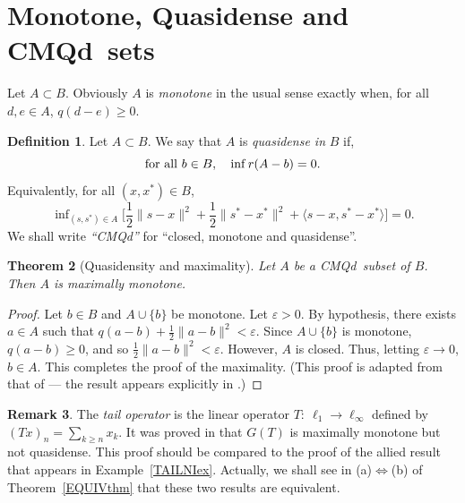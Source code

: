 \documentclass[letterpaper]{article}
\theoremstyle{plain}
\newtheorem{theorem}{Theorem}[section]
\theoremstyle{definition}
\newtheorem{definition}[theorem]{Definition}
\newtheorem{remark}[theorem]{Remark}
\numberwithin{equation}{section}
\newcommand{\all}{\hbox{for all}}
\newcommand{\bra}[2]{\langle#1,#2\rangle}
\newcommand{\cmqd}{{CMQd}}
\newcommand{\eps}{\varepsilon}
\newcommand{\half}{{\textstyle\frac{1}{2}}}
\newcommand{\infn}{\inf\nolimits}
\newcommand{\Def}{Definition~\ref}
\newcommand{\Ex}{Example~\ref}
\newcommand{\Rem}{Remark~\ref}
\newcommand{\Sec}{Section~\ref}
\newcommand{\Thm}{Theorem~\ref}
\begin{document}
\section{Monotone, Quasidense and \cmqd\ sets}\label{QDsec}
Let $A \subset B$.   Obviously $A$ is {\em monotone} in the usual sense exactly when, for all $d,e \in A$, $q(d - e) \ge 0$.
\begin{definition}\label{QDdef}
Let $A \subset B$.   We say that $A$ is {\em quasidense in }$B$ if,
\begin{equation}\label{QD1}
\all\ b \in B,\quad \infn r(A - b) = 0.
\end{equation} 
%
Equivalently, for all $(x,x^*) \in B$, 
\begin{equation}\label{QD2}
\infn_{(s,s^*) \in A}\big[\half\|s - x\|^2 + \half\|s^* - x^*\|^2 + \bra{s - x}{s^* - x^*}\big] = 0.
\end{equation}
%
We shall write {\em ``\cmqd''} for ``closed, monotone and quasidense''. 
\end{definition}
\begin{theorem}[Quasidensity and maximality]\label{RLMAXthm}
Let $A$ be a \cmqd\ subset of $B$.   Then $A$ is maximally monotone. 
\end{theorem}
%
\begin{proof}
Let $b \in B$ and $A \cup \{b\}$ be monotone.   Let $\eps > 0$.   By hypothesis, there exists $a \in A$ such that $q(a - b) + \half\|a - b\|^2 < \eps$.   Since $A \cup \{b\}$ is monotone, $q(a - b) \ge 0$, and so $\half\|a - b\|^2 < \eps$.   However, $A$ is closed.   Thus, letting $\eps \to 0$,  $b \in A$.   This completes the proof of the maximality.   \big(This proof is adapted from that of \cite[Lemma 4.7, p.\ 1027]{PARTONE} --- the result appears explicitly in \cite[Theorem 7.4(a), pp.\ 1032--1033]{PARTONE}.\big)     
\end{proof}
\begin{remark}\label{TAILrem}
The {\em tail operator} is the linear operator $T\colon\ \ell_1 \to \ell_\infty$ defined by $(Tx)_n = \sum_{k \ge n} x_k$.   It was proved in \cite[Example 7.10, p.\ 1034--1035]{PARTONE} that $G(T)$ is maximally monotone but not quasidense.  This proof should be compared to the proof of the allied result that appears in \Ex{TAILNIex}.   Actually, we shall see in (a)$\iff$(b) of \Thm{EQUIVthm} that these two results are equivalent.
\end{remark}
\end{document}
